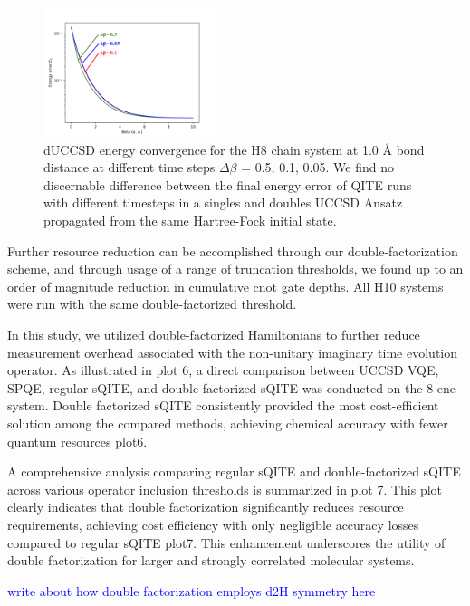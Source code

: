 \documentclass[aip,jcp,amsmath,amssymb, reprint]{revtex4-1}
\newcommand{\note}[2]{%
  \ifthenelse{\boolean{shownotes}}%
    {\textcolor{#1}{#2}}%
    {}%
}
\begin{document}
\begin{figure}[h!]
\centering
\includegraphics[width=0.45\textwidth]{sqite_paper/paper_db_plot.png}
\caption{dUCCSD energy convergence for the H8 chain system at 1.0 Å bond distance at different time steps $\Delta\beta$ = 0.5, 0.1, 0.05. We find no discernable difference between the final energy error of QITE runs with different timesteps in a singles and doubles UCCSD Ansatz propagated from the same Hartree-Fock initial state.}
\label{fig:db_plot_1.0A}
\end{figure}

Further resource reduction can be accomplished through our double-factorization scheme, and through usage of a range of truncation thresholds, we found up to an order of magnitude reduction in cumulative cnot gate depths. All H10 systems were run with the same double-factorized threshold.

In this study, we utilized double-factorized Hamiltonians to further reduce measurement overhead associated with the non-unitary imaginary time evolution operator. As illustrated in plot 6, a direct comparison between UCCSD VQE, SPQE, regular sQITE, and double-factorized sQITE was conducted on the 8-ene system. Double factorized sQITE consistently provided the most cost-efficient solution among the compared methods, achieving chemical accuracy with fewer quantum resources {plot6}.

A comprehensive analysis comparing regular sQITE and double-factorized sQITE across various operator inclusion thresholds is summarized in plot 7. This plot clearly indicates that double factorization significantly reduces resource requirements, achieving cost efficiency with only negligible accuracy losses compared to regular sQITE {plot7}. This enhancement underscores the utility of double factorization for larger and strongly correlated molecular systems.

\note{blue}{write about how double factorization employs d2H symmetry here}
\end{document}
